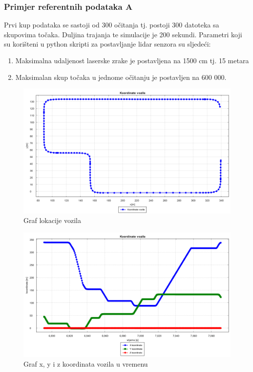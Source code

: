 \subsubsection{Primjer referentnih podataka A}
Prvi kup podataka se sastoji od 300 očitanja tj. postoji 300 datoteka sa skupovima točaka. Duljina trajanja te simulacije je 200 sekundi. Parametri koji su korišteni u python skripti za postavljanje lidar senzora su sljedeći:
\begin{enumerate}
  \item Maksimalna udaljenost laserske zrake je postavljena na 1500 cm tj. 15 metara
  \item Maksimalan skup točaka u jednome očitanju je postavljen na 600 000.
\end{enumerate}
\begin{figure}[H]
  \includegraphics[scale=0.4]{images/koordinate1.png}
  \caption{Graf lokacije vozila}
  \label{fig:gt1_lokacija}
\end{figure}
\begin{figure}[H]
  \includegraphics[scale=0.4]{images/koordinate_vrijeme1.png}
  \caption{Graf x, y i z koordinata vozila u vremenu}
  \label{fig:gt1_lokacija_koord}
\end{figure}
